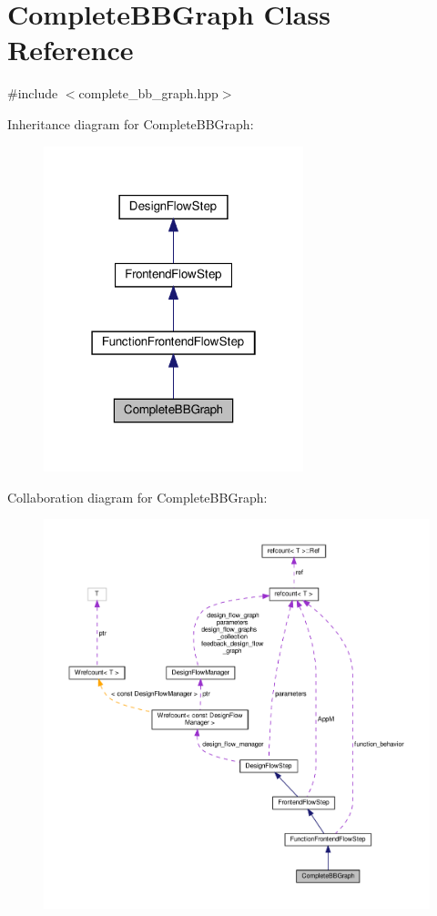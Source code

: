 \hypertarget{classCompleteBBGraph}{}\section{Complete\+B\+B\+Graph Class Reference}
\label{classCompleteBBGraph}


{\ttfamily \#include $<$complete\+\_\+bb\+\_\+graph.\+hpp$>$}



Inheritance diagram for Complete\+B\+B\+Graph\+:
\nopagebreak
\begin{figure}[H]
\begin{center}
\leavevmode
\includegraphics[width=214pt]{d3/d2c/classCompleteBBGraph__inherit__graph}
\end{center}
\end{figure}


Collaboration diagram for Complete\+B\+B\+Graph\+:
\nopagebreak
\begin{figure}[H]
\begin{center}
\leavevmode
\includegraphics[width=350pt]{d4/d2a/classCompleteBBGraph__coll__graph}
\end{center}
\end{figure}
